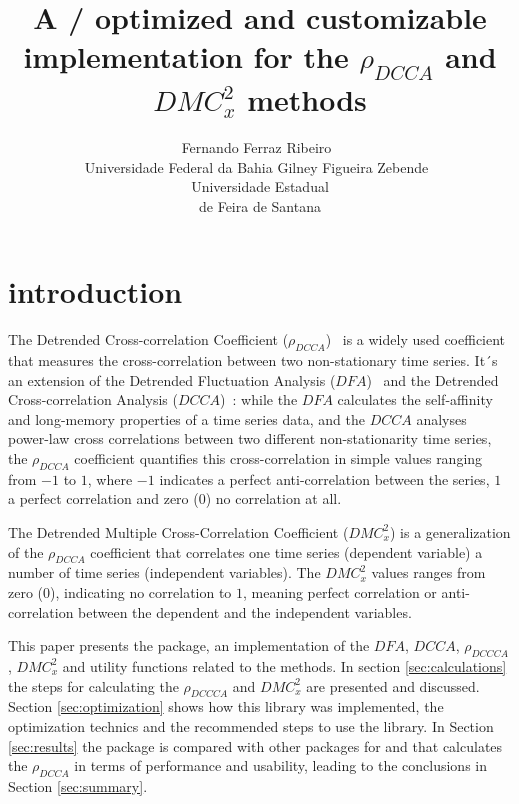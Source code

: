 \documentclass[article]{jss}
\author{Fernando Ferraz Ribeiro~\orcidlink{0000-0002-0685-4774}\\Universidade Federal da Bahia
   \And Gilney Figueira Zebende~\orcidlink{0000-0003-2420-9805}\\Universidade Estadual\\de Feira de Santana}
\title{A \proglang{Python}/\proglang{Zig} optimized and customizable implementation for the $\rho_{DCCA}$ and $DMC_x^2$ methods}
\begin{document}


\section{introduction} \label{sec:intro}

The Detrended Cross-correlation Coefficient ($\rho_{DCCA}$)~\citep{Zebende2011} is a widely used coefficient that measures the cross-correlation between two non-stationary time series. It´s an extension of the Detrended Fluctuation Analysis ($DFA$)~\citep{Peng_1994} and the Detrended Cross-correlation Analysis ($DCCA$)~\citep{Podobnik2008}: while the $DFA$ calculates the self-affinity and long-memory properties of a time series data, and the $DCCA$ analyses power-law cross correlations between two different non-stationarity time series, the $\rho_{DCCA}$ coefficient quantifies this cross-correlation in simple values ranging from $-1$ to $1$, where $-1$ indicates a perfect anti-correlation between the series, $1$ a perfect correlation and zero ($0$) no correlation at all.


The Detrended Multiple Cross-Correlation Coefficient \citep{Zebende2018} ($DMC_x^2$) is a generalization of the $\rho_{DCCA}$ coefficient that correlates one time series (dependent variable) a number of time series (independent variables). The $DMC_x^2$ values ranges from zero ($0$), indicating no correlation to $1$, meaning perfect correlation or anti-correlation between the dependent and the independent variables.


This paper presents the   package, an implementation of the $DFA$, $DCCA$, $\rho_{DCCCA}$, $DMC_x^2$ and utility functions related to the methods. In section \ref{sec:calculations} the steps for calculating the $\rho_{DCCCA}$ and $DMC_x^2$ are presented and discussed. Section \ref{sec:optimization} shows how this library was implemented, the optimization technics and the recommended steps to use the library. In Section \ref{sec:results} the  package is compared with other packages for  and  that calculates the $\rho_{DCCA}$ in terms of performance and usability, leading to the conclusions in Section \ref{sec:summary}.
\end{document}
